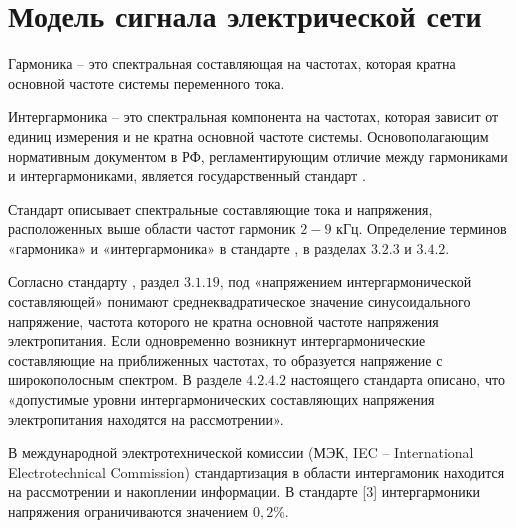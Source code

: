 \section{Модель сигнала электрической сети} \label{sec:ch1/sec3}

Гармоника -- это спектральная составляющая на частотах, которая кратна основной частоте системы переменного тока. 

Интергармоника -- это спектральная компонента на частотах, которая зависит от единиц измерения и не кратна основной частоте системы.
Основополагающим нормативным документом в РФ, регламентирующим отличие между гармониками и интергармониками, является государственный стандарт \cite{GOST30804.4.7-2013}. 

Стандарт  описывает спектральные составляющие тока и напряжения, расположенных выше области частот гармоник $2-9$ кГц. Определение терминов «гармоника» и «интергармоника» в стандарте \cite{GOST30804.4.7-2013}, в разделах $3.2.3$ и $3.4.2$.

Согласно стандарту \cite{GOST32144-2013}, раздел $3.1.19$, под «напряжением интергармонической составляющей» понимают среднеквадратическое значение синусоидального напряжение, частота которого не кратна основной частоте напряжения электропитания.
Если одновременно возникнут интергармонические составляющие на приближенных частотах, то образуется напряжение с широкополосным спектром. В разделе $4.2.4.2$ настоящего стандарта описано, что «допустимые уровни интергармонических составляющих напряжения электропитания находятся на рассмотрении».

В международной электротехнической комиссии (МЭК, IEC -- International Electrotechnical Commission) стандартизация в области интергамоник находится на рассмотрении и накоплении информации. В стандарте [3] интергармоники напряжения ограничиваются значением $0,2\%$.

